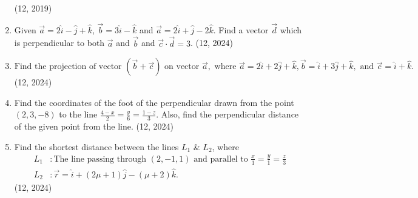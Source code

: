 \begin{enumerate}[label=\thesubsection.\arabic*, ref=\thesubsection.\theenumi]
		\hfill (12, 2019)
\item Given $\vec{a}=2\hat{i}-\hat{j}+\hat{k}$, $\vec{b}=3\hat{i}-\hat{k}$ and $\vec{a}=2\hat{i}+\hat{j}-2\hat{k}$. Find a vector $\vec{d}$ which is perpendicular to both $\vec{a}$ and $\vec{b}$ and $\vec{c}\cdot\vec{d}=3$.
		\hfill (12, 2024)
\item $\text{Find the projection of vector }(\vec{b} + \vec{c}) \text{ on vector } \vec{a}, \text{ where } \vec{a} = 2\hat{i} + 2\hat{j} + \hat{k}, \vec{b} = \hat{i} + 3\hat{j} + \hat{k}, \text{ and } \vec{c} = \hat{i} + \hat{k}.$
		\hfill (12, 2024)
\item  Find the coordinates of the foot of the perpendicular drawn from the point $(2, 3, -8)$ to the line $\frac{4-x}{2} = \frac{y}{6} = \frac{1-z}{3}$.
Also, find the perpendicular distance of the given point from the line.
		\hfill (12, 2024)
\item Find the shortest distance between the lines  $L_1$  \& $ L_2$, where 
\begin{align*}
	L_1&: \text{The line passing through }(2,-1, 1) \text{ and parallel to } \frac{x}{1} = \frac{y}{1} = \frac{z}{3}\\
	L_2&: \vec{r} = \hat{i} + (2\mu+1)\hat{j} - (\mu+2)\hat{k}.
\end{align*}
		\hfill (12, 2024)
\end{enumerate}
